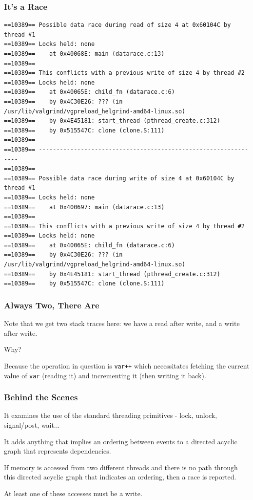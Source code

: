 \begin{frame}[fragile]
\frametitle{It's a Race}
{\scriptsize
\begin{verbatim}
==10389== Possible data race during read of size 4 at 0x60104C by thread #1
==10389== Locks held: none
==10389==    at 0x40068E: main (datarace.c:13)
==10389== 
==10389== This conflicts with a previous write of size 4 by thread #2
==10389== Locks held: none
==10389==    at 0x40065E: child_fn (datarace.c:6)
==10389==    by 0x4C30E26: ??? (in /usr/lib/valgrind/vgpreload_helgrind-amd64-linux.so)
==10389==    by 0x4E45181: start_thread (pthread_create.c:312)
==10389==    by 0x515547C: clone (clone.S:111)
==10389== 
==10389== ----------------------------------------------------------------
==10389== 
==10389== Possible data race during write of size 4 at 0x60104C by thread #1
==10389== Locks held: none
==10389==    at 0x400697: main (datarace.c:13)
==10389== 
==10389== This conflicts with a previous write of size 4 by thread #2
==10389== Locks held: none
==10389==    at 0x40065E: child_fn (datarace.c:6)
==10389==    by 0x4C30E26: ??? (in /usr/lib/valgrind/vgpreload_helgrind-amd64-linux.so)
==10389==    by 0x4E45181: start_thread (pthread_create.c:312)
==10389==    by 0x515547C: clone (clone.S:111)
\end{verbatim}
}
\end{frame}

\begin{frame}
\frametitle{Always Two, There Are}


Note that we get two stack traces here: we have a read after write, and a write after write. 

Why? 

Because the operation in question is \texttt{var++} which necessitates fetching the current value of \texttt{var} (reading it) and incrementing it (then writing it back).

\end{frame}

\begin{frame}
\frametitle{Behind the Scenes}

It examines the use of the standard threading primitives - lock, unlock, signal/post, wait... 

It adds anything that implies an ordering between events to a directed acyclic graph that represents dependencies. 

If memory is accessed from two different threads and there is no path through this directed acyclic graph that indicates an ordering, then a race is reported. 

At least one of these accesses must be a write.

\end{frame}


